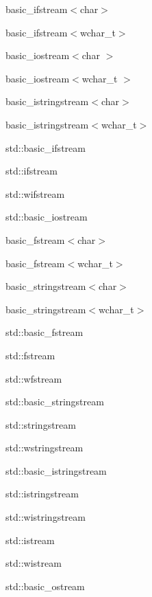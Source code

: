 \begin{DoxyCompactList}
\begin{DoxyCompactList}
\begin{DoxyCompactList}
\begin{DoxyCompactList}
\item basic\+\_\+ifstream$<$char$>$\item basic\+\_\+ifstream$<$wchar\+\_\+t$>$\item basic\+\_\+iostream$<$char $>$\item basic\+\_\+iostream$<$wchar\+\_\+t $>$\item basic\+\_\+istringstream$<$char$>$\item basic\+\_\+istringstream$<$wchar\+\_\+t$>$\item std\+:\+:basic\+\_\+ifstream\begin{DoxyCompactList}
\item std\+:\+:ifstream\item std\+:\+:wifstream\end{DoxyCompactList}
\item std\+:\+:basic\+\_\+iostream\begin{DoxyCompactList}
\item basic\+\_\+fstream$<$char$>$\item basic\+\_\+fstream$<$wchar\+\_\+t$>$\item basic\+\_\+stringstream$<$char$>$\item basic\+\_\+stringstream$<$wchar\+\_\+t$>$\item std\+:\+:basic\+\_\+fstream\begin{DoxyCompactList}
\item std\+:\+:fstream\item std\+:\+:wfstream\end{DoxyCompactList}
\item std\+:\+:basic\+\_\+stringstream\begin{DoxyCompactList}
\item std\+:\+:stringstream\item std\+:\+:wstringstream\end{DoxyCompactList}
\end{DoxyCompactList}
\item std\+:\+:basic\+\_\+istringstream\begin{DoxyCompactList}
\item std\+:\+:istringstream\item std\+:\+:wistringstream\end{DoxyCompactList}
\item std\+:\+:istream\item std\+:\+:wistream\end{DoxyCompactList}
\item std\+:\+:basic\+\_\+ostream\begin{DoxyCompactList}

\end{DoxyCompactList}
\end{DoxyCompactList}
\end{DoxyCompactList}
\end{DoxyCompactList}

